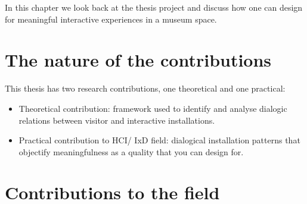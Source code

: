 In this chapter we look back at the thesis project and discuss how one can design for meaningful interactive experiences in a museum space.

\section{The nature of the contributions}
This thesis has two research contributions, one theoretical and one practical:
\begin{itemize}
    \item Theoretical contribution: framework used to identify and analyse dialogic relations between visitor and interactive installations.
    \item Practical contribution to HCI/ IxD field: dialogical installation patterns that objectify meaningfulness as a quality that you can design for.
\end{itemize}


\section{Contributions to the field}

